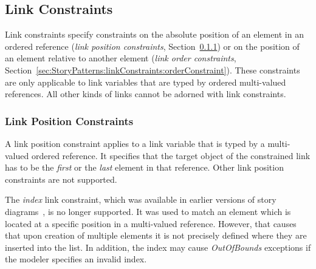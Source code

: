 {
\subsection{Link Constraints}
\label{sec:StoryPatterns:linkConstraints}

Link constraints specify constraints on the absolute position of an element in an ordered reference (\emph{link position constraints}, Section~\ref{sec:StoryPatterns:linkConstraints:posConstraint}) or on the position of an element relative to another element (\emph{link order constraints}, Section~\ref{sec:StoryPatterns:linkConstraints:orderConstraint}). These constraints are only applicable to link variables that are typed by ordered multi-valued references. All other kinds of links cannot be adorned with link constraints.



\subsubsection{Link Position Constraints}
\label{sec:StoryPatterns:linkConstraints:posConstraint}

A link position constraint applies to a link variable that is typed by a multi-valued ordered reference. It specifies that the target object of the constrained link has to be the \emph{first} or the \emph{last} element in that reference. Other link position constraints are not supported. 

The \emph{index} link constraint, which was available in earlier versions of story diagrams~\cite{WW01_ag}, is no longer supported. 
It was used to match an element which is located at a specific position in a multi-valued reference. 
However, that causes that upon creation of multiple elements it is not precisely defined where they are inserted into the list. 
In addition, the index may cause \emph{OutOfBounds} exceptions if the modeler specifies an invalid index.

}

